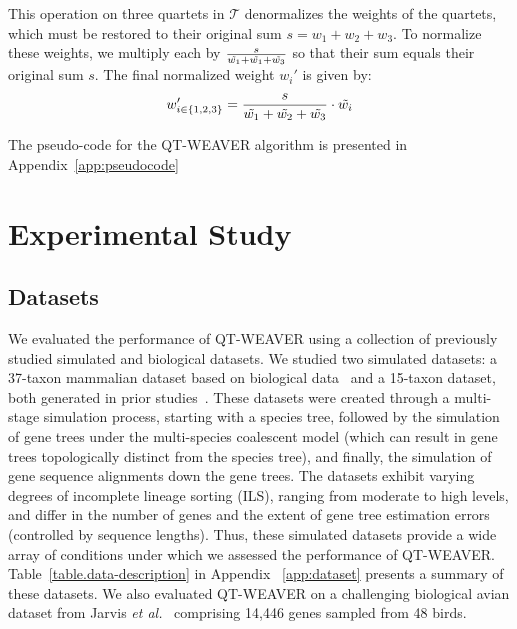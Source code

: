 \documentclass[runningheads]{llncs}
\begin{document}
This operation on three quartets in $\mathcal{T}$ denormalizes the weights of the quartets, which must be restored to their original sum $s = w_1+w_2+w_3$. %
To normalize these weights, we multiply each by $\frac{s}{\Tilde{w_1} + \Tilde{w_1} + \Tilde{w_3}}$ so that their sum equals their original sum $s$. The final normalized weight $w_i'$ is given by:
$$
w_{i \in \{1,2,3\}}'  = \frac{ s }{\Tilde{w_1} + \Tilde{w_2} + \Tilde{w_3}} \cdot \Tilde{w_i}
$$


The pseudo-code for the QT-WEAVER algorithm is presented in Appendix~\ref{app:pseudocode}


\section{Experimental Study}
\subsection{Datasets}
%

We evaluated the performance of QT-WEAVER using a collection of previously studied simulated and biological datasets. We studied two simulated datasets: a 37-taxon mammalian dataset based on biological data~\cite{song-mammal} and a 15-taxon dataset, both generated in prior studies~\cite{statistical-binning,bayzid2015weighted}. These datasets were created through a multi-stage simulation process, starting with a species tree, followed by the simulation of gene trees under the multi-species coalescent model (which can result in gene trees topologically distinct from the species tree), and finally, the simulation of gene sequence alignments down the gene trees. The datasets exhibit varying degrees of incomplete lineage sorting (ILS), ranging from moderate to high levels, and differ in the number of genes and the extent of gene tree estimation errors (controlled by sequence lengths). Thus, these simulated datasets provide a wide array of conditions under which we assessed the performance of QT-WEAVER. %
Table~\ref{table.data-description} in Appendix ~\ref{app:dataset} presents a summary of these datasets. 
We also evaluated QT-WEAVER on a challenging biological avian dataset from Jarvis \textit{et al.}~\cite{jarvis2014} comprising 14,446 genes sampled from 48 birds.
\end{document}
